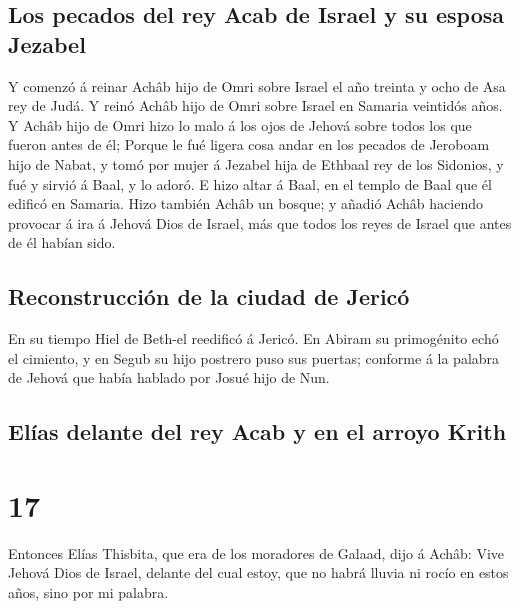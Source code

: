 \hypertarget{los-pecados-del-rey-acab-de-israel-y-su-esposa-jezabel}{%
\subsection{Los pecados del rey Acab de Israel y su esposa
Jezabel}\label{los-pecados-del-rey-acab-de-israel-y-su-esposa-jezabel}}

 Y comenzó á reinar Achâb hijo de Omri sobre Israel el año
treinta y ocho de Asa rey de Judá.  Y reinó Achâb hijo de
Omri sobre Israel en Samaria veintidós años. Y Achâb hijo de Omri hizo
lo malo á los ojos de Jehová sobre todos los que fueron antes de él;
 Porque le fué ligera cosa andar en los pecados de Jeroboam
hijo de Nabat, y tomó por mujer á Jezabel hija de Ethbaal rey de los
Sidonios, y fué y sirvió á Baal, y lo adoró.  E hizo altar
á Baal, en el templo de Baal que él edificó en Samaria. 
Hizo también Achâb un bosque; y añadió Achâb haciendo provocar á ira á
Jehová Dios de Israel, más que todos los reyes de Israel que antes de él
habían sido.

\hypertarget{reconstrucciuxf3n-de-la-ciudad-de-jericuxf3}{%
\subsection{Reconstrucción de la ciudad de
Jericó}\label{reconstrucciuxf3n-de-la-ciudad-de-jericuxf3}}

 En su tiempo Hiel de Beth-el reedificó á Jericó. En Abiram
su primogénito echó el cimiento, y en Segub su hijo postrero puso sus
puertas; conforme á la palabra de Jehová que había hablado por Josué
hijo de Nun.

\hypertarget{eluxedas-delante-del-rey-acab-y-en-el-arroyo-krith}{%
\subsection{Elías delante del rey Acab y en el arroyo
Krith}\label{eluxedas-delante-del-rey-acab-y-en-el-arroyo-krith}}

\hypertarget{section-16}{%
\section{17}\label{section-16}}

 Entonces Elías Thisbita, que era de los moradores de
Galaad, dijo á Achâb: Vive Jehová Dios de Israel, delante del cual
estoy, que no habrá lluvia ni rocío en estos años, sino por mi palabra.

